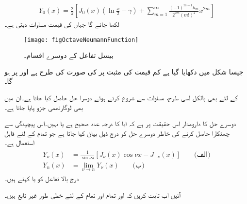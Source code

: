 \begin{align}\label{مساوات_بیسل_نیومن_درجہ_صفر}
Y_0(x)=\frac{2}{\pi}\left[J_0(x) \left(\ln \frac{x}{2}+\gamma\right)+\sum_{m=1}^{\infty} \frac{(-1)^{m-1} h_m}{2^{2m}(m!)^2}x^{2m}\right]
\end{align}
لکھا جائے گا جہاں  کی قیمت مساوات   دیتی ہے۔
\begin{figure}
\centering
\texttt{[image: figOctaveNeumannFunction]}
\caption{بیسل تفاعل کے دوسرے اقسام۔}
\label{شکل_بیسل_نیومن_درجہ_صفر}
\end{figure}
جیسا شکل  میں دکھایا گیا ہے کم قیمت کی مثبت  پر  کی صورت  کی طرح ہے اور  پر  ہو گا۔

 کے لئے بھی بالکل اسی طرح، مساوات  سے شروع کرتے ہوئے  دوسرا حل حاصل کیا جاتا ہے۔ان میں بھی لوگارتھمی جزو پایا جاتا ہے۔

دوسرے حل کا دارومدار اس حقیقت پر ہے کہ آیا  کا درجہ عدد صحیح ہے یا نہیں۔اس پیچیدگی  سے چھٹکارا حاصل کرنے کی خاطر دوسرے حل کو درج ذیل بیان کیا جاتا ہے جو تمام  کے لئے قابل استعمال ہے۔
\begin{gather}
\begin{aligned}\label{مساوات_بیسل_نیومن_عمومی_حل_الف}
Y_{\nu}(x)&=\frac{1}{\sin \nu \pi} [J_{\nu}(x)\cos \nu x-J_{-\nu}(x)] \quad \quad \text{(الف)}\\
Y_n(x)&=\lim_{\nu \to n} Y_{\nu}(x)\quad \quad \text{(ب)}
\end{aligned}
\end{gather}
درج بالا تفاعل کو  یا  کہتے ہیں۔ 

آئیں اب ثابت کریں کہ  اور  تمام  اور تمام  کے لئے خطی طور غیر تابع ہیں۔


